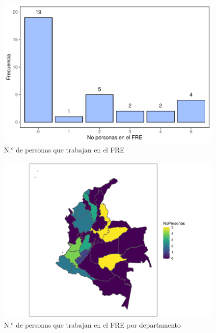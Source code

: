 \documentclass[
]{book}
\begin{document}
\begin{figure}
\includegraphics[width=0.85\linewidth]{InformeFinal_files/figure-latex/perfilProfesional3-1} \caption{N.° de personas que trabajan en el FRE}\label{fig:perfilProfesional3}
\end{figure}

\begin{figure}
\includegraphics[width=0.85\linewidth]{InformeFinal_files/figure-latex/mapaProfesional2-1} \caption{N.° de personas que trabajan en el FRE por departamento}\label{fig:mapaProfesional2}
\end{figure}
\end{document}
